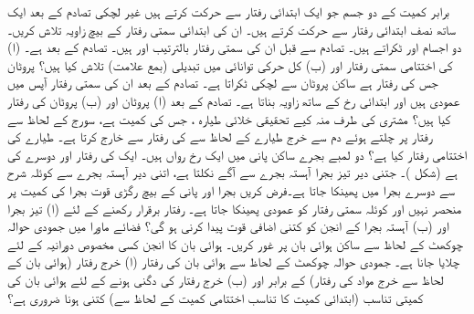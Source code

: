 برابر کمیت کے دو جسم  جو ایک ابتدائی رفتار سے حرکت کرتے ہیں غیر لچکی تصادم کے بعد ایک ساتھ نصف ابتدائی  رفتار سے حرکت کرتے ہیں۔ ان کی ابتدائی سمتی رفتار کے بیچ زاویہ تلاش کریں۔
دو   اجسام  اور   ٹکراتے ہیں۔ تصادم سے قبل ان کی سمتی رفتار بالترتیب   اور  ہیں۔ تصادم کے بعد   ہے۔ (ا)   کی اختتامی سمتی رفتار اور (ب) کل   حرکی توانائی میں تبدیلی (بمع علامت) تلاش کیا ہیں؟
 پروٹان   جس کی رفتار  ہے   ساکن  پروٹان    سے لچکی ٹکراتا ہے۔ تصادم کے بعد ان کی سمتی رفتار  آپس میں عمودی ہیں اور  ابتدائی رخ کے ساتھ  زاویہ بناتا ہے۔ تصادم کے بعد (ا) پروٹان  اور (ب) پروٹان   کی رفتار  کیا ہیں؟
مشتری کی طرف  منہ کیے تحقیقی خلائی طیارہ ، جس کی کمیت  ہے،  سورج کے لحاظ سے   رفتار پر چلتے ہوئے دم سے    خرج   طیارے کے لحاظ سے  کی رفتار سے خارج کرتا ہے۔ طیارے کی اختتامی رفتار کیا  ہے؟
دو لمبے  بجرے  ساکن پانی میں ایک رخ رواں ہیں۔ ایک کی رفتار  اور دوسرے کی  ہے (شکل )۔ جتنی دیر  تیز بجرا آہستہ بجرے سے آگے نکلتا ہے، اتنی دیر  آہستہ بجرے سے کوئلہ  شرح سے دوسرے بجرا میں پھینکا جاتا ہے۔فرض کریں بجرا اور پانی کے بیچ رگڑی قوت بجرا کی کمیت پر منحصر نہیں اور کوئلہ سمتی رفتار کو عمودی پھینکا جاتا ہے۔ رفتار برقرار رکھنے کے لئے (ا) تیز بجرا اور (ب) آہستہ بجرا  کے انجن کو کتنی اضافی قوت پیدا کرنی ہو گی؟ 
فضائے ماورا  میں جمودی  حوالہ چوکھٹ کے لحاظ سے ساکن ہوائی بان   پر غور کریں۔ ہوائی بان کا  انجن کسی مخصوص دورانیہ کے لئے چلایا جانا ہے۔ جمودی  حوالہ چوکھٹ کے لحاظ سے  ہوائی بان کی رفتار (ا)    خرج رفتار (ہوائی بان  کے لحاظ سے خرج مواد کی رفتار) کے برابر  اور (ب) خرج رفتار کی دگنی ہونے کے لئے ہوائی بان کی کمیتی تناسب (ابتدائی کمیت  کا تناسب  اختتامی کمیت  کے لحاظ سے) کتنی ہونا ضروری ہے؟
